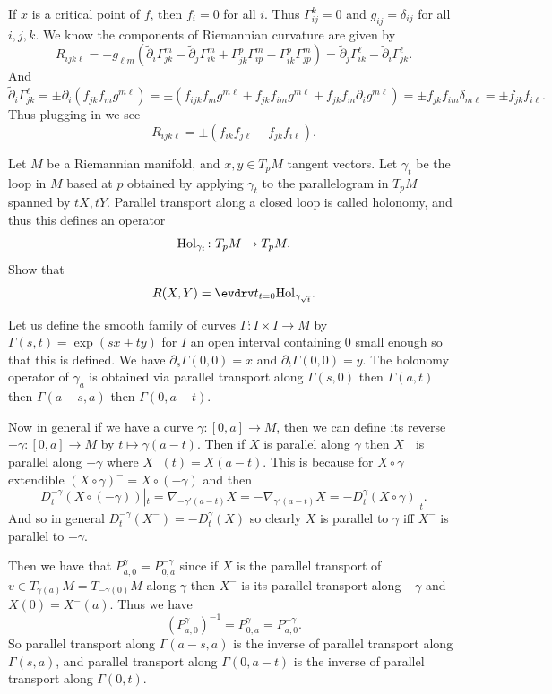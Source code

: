     \item If $x$ is a critical point of $f$, then $f_i=0$ for all $i$.
    Thus $\Gamma^k_{ij}=0$ and $g_{ij}=\delta_{ij}$ for all $i,j,k$.
    We know the components of Riemannian curvature are given by
    $$ R_{ijk\ell} = -g_{\ell m}(\tilde\partial_i\Gamma^m_{jk} - \tilde\partial_j\Gamma^m_{ik} + \Gamma^p_{jk}\Gamma^m_{ip} - \Gamma^p_{ik}\Gamma^m_{jp}) = \tilde\partial_j\Gamma^\ell_{ik} - \tilde\partial_i\Gamma^\ell_{jk} . $$
    And
    $$ \tilde\partial_i\Gamma^\ell_{jk} = \pm\partial_i(f_{jk}f_mg^{m\ell}) = \pm(f_{ijk}f_mg^{m\ell} + f_{jk}f_{im}g^{m\ell} + f_{jk}f_m\partial_ig^{m\ell}) = \pm f_{jk}f_{im}\delta_{m\ell} = \pm f_{jk}f_{i\ell} . $$
    Thus plugging in we see
    $$ R_{ijk\ell} = \pm(f_{ik}f_{j\ell} - f_{jk}f_{i\ell}) . $$
\eenum

\def\hol{{\rm Hol}}

\bprob

    Let $M$ be a Riemannian manifold, and $x,y\in T_pM$ tangent vectors.
    Let $\gamma_t$ be the loop in $M$ based at $p$ obtained by applying $\gamma_t$ to the parallelogram in $T_pM$ spanned by $tX,tY$.
    Parallel transport along a closed loop is called {\emphcolor holonomy}, and thus this defines an operator
    $$ \hol_{\gamma_t}\colon T_pM\to T_pM . $$
    Show that
    $$ R(X,Y) = \evdrv t_{t=0}\hol_{\gamma_{\sqrt t}} . $$

\eprob

Let us define the smooth family of curves $\Gamma\colon I\times I\to M$ by $\Gamma(s,t)=\exp(sx+ty)$ for $I$ an open interval containing $0$ small enough so that this is defined.
We have $\partial_s\Gamma(0,0)=x$ and $\partial_t\Gamma(0,0)=y$.
The holonomy operator of $\gamma_a$ is obtained via parallel transport along $\Gamma(s,0)$ then $\Gamma(a,t)$ then $\Gamma(a-s,a)$ then $\Gamma(0,a-t)$.

Now in general if we have a curve $\gamma\colon[0,a]\to M$, then we can define its reverse $-\gamma\colon[0,a]\to M$ by $t\mapsto\gamma(a-t)$.
Then if $X$ is parallel along $\gamma$ then $X^-$ is parallel along $-\gamma$ where $X^-(t)=X(a-t)$.
This is because for $X\circ\gamma$ extendible $(X\circ\gamma)^-=X\circ(-\gamma)$ and then
$$ D_t^{-\gamma}(X\circ(-\gamma))|_t = \nabla_{-\gamma'(a-t)}X = -\nabla_{\gamma'(a-t)}X = -D^\gamma_t(X\circ\gamma)|_t . $$
And so in general $D_t^{-\gamma}(X^-)=-D^\gamma_t(X)$ so clearly $X$ is parallel to $\gamma$ iff $X^-$ is parallel to $-\gamma$.

Then we have that $P^\gamma_{a,0}=P^{-\gamma}_{0,a}$ since if $X$ is the parallel transport of $v\in T_{\gamma(a)}M=T_{-\gamma(0)}M$ along $\gamma$ then $X^-$ is its parallel
transport along $-\gamma$ and $X(0)=X^-(a)$.
Thus we have
$$ (P^\gamma_{a,0})^{-1} = P^\gamma_{0,a} = P^{-\gamma}_{a,0} . $$
So parallel transport along $\Gamma(a-s,a)$ is the inverse of parallel transport along $\Gamma(s,a)$, and parallel transport along $\Gamma(0,a-t)$ is the inverse of parallel
transport along $\Gamma(0,t)$.

